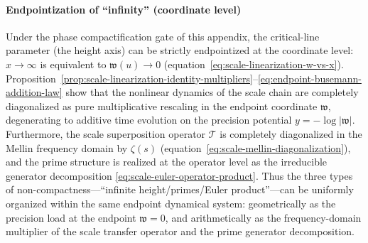 \paragraph{Endpointization of ``infinity'' (coordinate level)}
Under the phase compactification gate of this appendix, the critical-line parameter (the height axis) can be strictly endpointized at the coordinate level: \(x\to\infty\) is equivalent to \(\mathfrak{w}(u)\to 0\) (equation~\eqref{eq:scale-linearization-w-vs-x}).
Proposition~\ref{prop:scale-linearization-identity-multipliers}--\eqref{eq:endpoint-busemann-addition-law} show that the nonlinear dynamics of the scale chain are completely diagonalized as pure multiplicative rescaling in the endpoint coordinate \(\mathfrak{w}\), degenerating to additive time evolution on the precision potential \(y=-\log|\mathfrak{w}|\).
Furthermore, the scale superposition operator \(\mathcal{T}\) is completely diagonalized in the Mellin frequency domain by \(\zeta(s)\) (equation~\eqref{eq:scale-mellin-diagonalization}), and the prime structure is realized at the operator level as the irreducible generator decomposition \eqref{eq:scale-euler-operator-product}.
Thus the three types of non-compactness---``infinite height/primes/Euler product''---can be uniformly organized within the same endpoint dynamical system: geometrically as the precision load at the endpoint \(\mathfrak{w}=0\), and arithmetically as the frequency-domain multiplier of the scale transfer operator and the prime generator decomposition.
